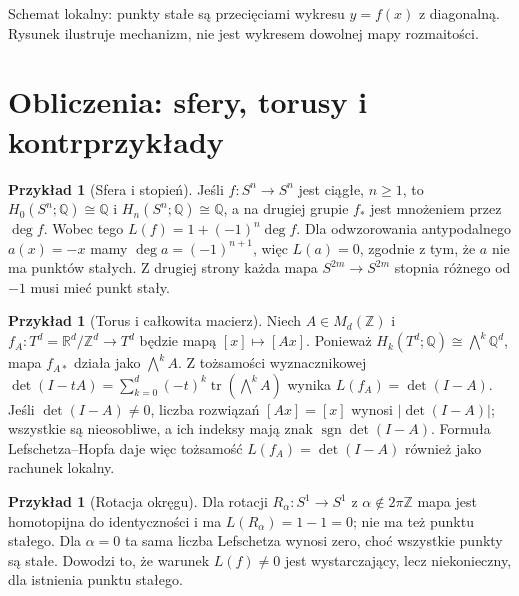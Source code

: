 \documentclass[11pt,a4paper,oneside]{report}
\newcommand{\R}{\mathbb{R}}
\newcommand{\Z}{\mathbb{Z}}
\newcommand{\Q}{\mathbb{Q}}
\theoremstyle{plain}
\theoremstyle{definition}
\newtheorem{przyklad}[twierdzenie]{Przykład}
\theoremstyle{remark}
\begin{document}
\begin{center}
\end{center}
\begin{center}\small Schemat lokalny: punkty stałe są przecięciami
wykresu $y=f(x)$ z diagonalną. Rysunek ilustruje mechanizm,
nie jest wykresem dowolnej mapy rozmaitości.\end{center}

\section{Obliczenia: sfery, torusy i kontrprzykłady}
\begin{przyklad}[Sfera i stopień]
Jeśli $f:S^n\to S^n$ jest ciągłe, $n\ge1$,
to $H_0(S^n;\Q)\cong\Q$ i $H_n(S^n;\Q)\cong\Q$,
a na drugiej grupie $f_*$ jest mnożeniem przez $\deg f$.
Wobec tego $L(f)=1+(-1)^n\deg f$.
Dla odwzorowania antypodalnego $a(x)=-x$ mamy
$\deg a=(-1)^{n+1}$, więc $L(a)=0$, zgodnie z tym,
że $a$ nie ma punktów stałych.
Z drugiej strony każda mapa $S^{2m}\to S^{2m}$
stopnia różnego od $-1$ musi mieć punkt stały.
\end{przyklad}

\begin{przyklad}[Torus i całkowita macierz]
Niech $A\in M_d(\Z)$ i $f_A:T^d=\R^d/\Z^d\to T^d$
będzie mapą $[x]\mapsto[Ax]$. Ponieważ
$H_k(T^d;\Q)\cong\bigwedge^k\Q^d$,
mapa $f_{A*}$ działa jako $\bigwedge^k A$.
Z tożsamości wyznacznikowej
$\det(I-tA)=\sum_{k=0}^d(-t)^k
 \operatorname{tr}(\bigwedge^kA)$ wynika
$L(f_A)=\det(I-A)$.
Jeśli $\det(I-A)\ne0$, liczba rozwiązań $[Ax]=[x]$
wynosi $|\det(I-A)|$; wszystkie są nieosobliwe,
a ich indeksy mają znak $\operatorname{sgn}\det(I-A)$.
Formuła Lefschetza--Hopfa daje więc tożsamość
$L(f_A)=\det(I-A)$ również jako rachunek lokalny.
\end{przyklad}

\begin{przyklad}[Rotacja okręgu]
Dla rotacji $R_\alpha:S^1\to S^1$ z $\alpha\notin2\pi\Z$
mapa jest homotopijna do identyczności i ma
$L(R_\alpha)=1-1=0$; nie ma też punktu stałego.
Dla $\alpha=0$ ta sama liczba Lefschetza wynosi zero,
choć wszystkie punkty są stałe. Dowodzi to, że
warunek $L(f)\ne0$ jest wystarczający, lecz niekonieczny,
dla istnienia punktu stałego.
\end{przyklad}
\end{document}
